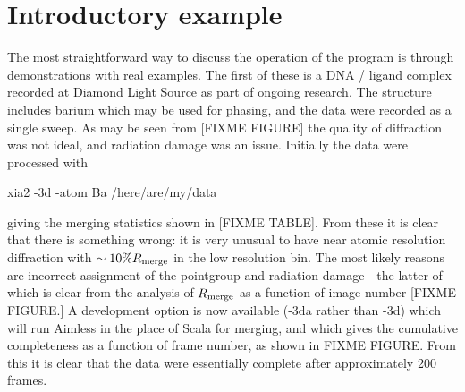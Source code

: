 \documentclass[a4paper, 11pt]{article}
\begin{document}
\section{Introductory example}

The most straightforward way to discuss the operation of the program is 
through demonstrations with real examples. The first of these is a DNA / 
ligand complex recorded at Diamond Light Source as part of ongoing research.
The structure includes barium which may be used for phasing, and the data
were recorded as a single sweep. As may be seen from [FIXME FIGURE] the
quality of diffraction was not ideal, and radiation damage was an issue.
Initially the data were processed with 

\begin{center}
{\huge
xia2 -3d -atom Ba /here/are/my/data
}
\end{center}

\noindent
giving the merging statistics shown in [FIXME TABLE]. From these it is clear
that there is something wrong: it is very unusual to have near atomic 
resolution diffraction with $\sim 10\% R_{\rm{merge}}$ in the low resolution
bin. The most likely reasons are incorrect assignment of the pointgroup and
radiation damage - the latter of which is clear from the analysis of 
$R_{\rm{merge}}$ as a function of image number [FIXME FIGURE.] A development 
option is now available (-3da rather than -3d) which will run Aimless in the 
place of Scala for merging, and which gives the cumulative completeness as
a function of frame number, as shown in FIXME FIGURE. From this it is clear 
that the data were essentially complete after approximately 200 frames. 
\end{document}
